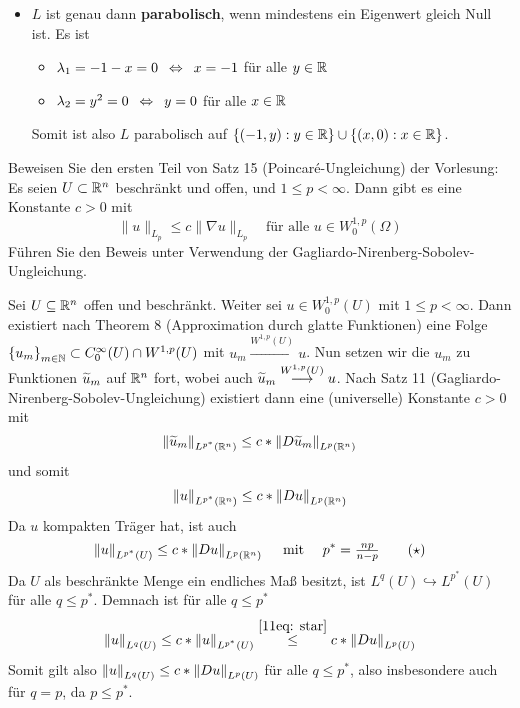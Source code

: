 \begin{exercisePage}
\begin{itemize}[leftmargin=*]
		\item $L$ ist genau dann \textbf{parabolisch}, wenn mindestens ein Eigenwert gleich Null ist. Es ist
		\begin{itemize}[nolistsep, topsep=-\parskip]
			\item $\lambda_1 = -1 - x = 0 \enskip \Leftrightarrow \enskip x = -1$ für alle $y \in \mathbb{R}$
			\item $\lambda_2 = y^2 = 0 \enskip \Leftrightarrow \enskip y = 0$ für alle $x \in \mathbb{R}$
		\end{itemize}
		Somit ist also $L$ parabolisch auf $\left\{ (-1,y) : y \in \mathbb{R} \right\} \cup \left\{ (x,0) : x \in \mathbb{R} \right\}$.
	\end{itemize}
	
	
	\pagebreak
	
	\begin{task}
		Beweisen Sie den ersten Teil von Satz 15 (Poincar\'e-Ungleichung) der Vorlesung:
		Es seien $U \subset \mathbb{R}^n$ beschränkt und offen, und $1 \leq p < \infty$. Dann gibt es eine Konstante $c>0$ mit
		\begin{equation*}
			\|u\|_{L_p}\leq c\|\nabla u\|_{L_p} \quad\text{für alle } u \in W^{1,p}_0(\Omega)
		\end{equation*}
		Führen Sie den Beweis unter Verwendung der Gagliardo-Nirenberg-Sobolev-Ungleichung.
	\end{task}

	Sei $U \subseteq \mathbb{R}^n$ offen und beschränkt. Weiter sei $u \in W_0^{1,p}(U)$ mit $1 \le p < \infty$. Dann existiert nach Theorem 8 (Approximation durch glatte Funktionen) eine Folge $\left\{ u_m \right\}_{m \in \mathbb{N}} \subset C_0^\infty(U) \cap W^{1,p}(U)$ mit $u_m \overset{W^{1,p}(U)}{\longrightarrow} u$. Nun setzen wir die $u_m$ zu Funktionen $\widetilde{u}_m$ auf $\mathbb{R}^n$ fort, wobei auch $\widetilde{u}_m \overset{W^{1,p}(U)}{\longrightarrow} u$. Nach Satz 11 (Gagliardo-Nirenberg-Sobolev-Ungleichung) existiert dann eine (universelle) Konstante $c > 0$ mit
	\begin{equation*}
		\left\lVert \widetilde{u}_m \right\rVert_{L^{p^\ast}(\mathbb{R}^n)} \le c * \left\lVert D \widetilde{u}_m \right\rVert_{L^p(\mathbb{R}^n)}
	\end{equation*}
	und somit
	\begin{equation*}
		\left\lVert u \right\rVert_{L^{p^\ast}(\mathbb{R}^n)} \le c * \left\lVert D u \right\rVert_{L^p(\mathbb{R}^n)}
	\end{equation*}
	Da $u$ kompakten Träger hat, ist auch
	\begin{equation}
		\left\lVert u \right\rVert_{L^{p^\ast}(U)} \le c * \left\lVert D u \right\rVert_{L^p(\mathbb{R}^n)} \quad \text{ mit } \quad p^\ast = \tfrac{np}{n-p} \tag{$\star$} \label{11eq: star}
	\end{equation}
	Da $U$ als beschränkte Menge ein endliches Maß besitzt, ist $L^q(U) \hookrightarrow L^{p^\ast}(U)$ für alle $q \le p^\ast$. Demnach ist für alle $q \le p^\ast$
	\begin{equation*}
		\left\lVert u \right\rVert_{L^q(U)} \le c * \left\lVert u \right\rVert_{L^{p^\ast}(U)} \overset{\eqref{11eq: star}}{\le} c * \left\lVert D u \right\rVert_{L^p(U)}
	\end{equation*}
	Somit gilt also $\left\lVert u \right\rVert_{L^q(U)} \le c * \left\lVert D u \right\rVert_{L^p(U)}$ für alle $q \le p^\ast$, also insbesondere auch für $q = p$, da $p \le p^\ast$.
	
\end{exercisePage}